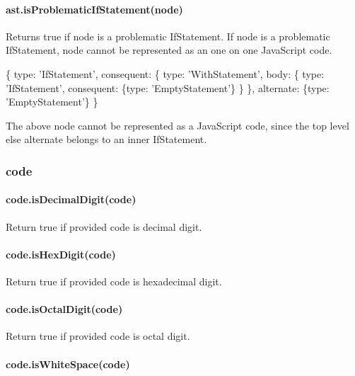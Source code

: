 \paragraph*{ast.\+is\+Problematic\+If\+Statement(node)}

Returns true if {\ttfamily node} is a problematic If\+Statement. If {\ttfamily node} is a problematic {\ttfamily If\+Statement}, {\ttfamily node} cannot be represented as an one on one Java\+Script code. 
\begin{DoxyCode}
\{
    type: \textcolor{stringliteral}{'IfStatement'},
    consequent: \{
        type: \textcolor{stringliteral}{'WithStatement'},
        body: \{
            type: \textcolor{stringliteral}{'IfStatement'},
            consequent: \{type: \textcolor{stringliteral}{'EmptyStatement'}\}
        \}
    \},
    alternate: \{type: \textcolor{stringliteral}{'EmptyStatement'}\}
\}
\end{DoxyCode}
 The above node cannot be represented as a Java\+Script code, since the top level {\ttfamily else} alternate belongs to an inner {\ttfamily If\+Statement}.

\subsubsection*{code}

\paragraph*{code.\+is\+Decimal\+Digit(code)}

Return true if provided code is decimal digit.

\paragraph*{code.\+is\+Hex\+Digit(code)}

Return true if provided code is hexadecimal digit.

\paragraph*{code.\+is\+Octal\+Digit(code)}

Return true if provided code is octal digit.

\paragraph*{code.\+is\+White\+Space(code)}

